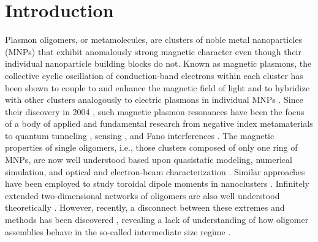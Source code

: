 \documentclass [11pt, proquest] {uwthesis}[2016/11/22]
\begin{document}
\section{Introduction}
Plasmon oligomers, or metamolecules, are clusters of noble metal nanoparticles (MNPs) that exhibit anomalously strong magnetic character even though their individual nanoparticle building blocks do not. Known as magnetic plasmons, the collective cyclic oscillation of conduction-band electrons within each cluster has been shown to couple to and enhance the magnetic field of light and to hybridize with other clusters analogously to electric plasmons in individual MNPs \cite{Zhang2006,Zhang2007,NordHal2011,NordHal2012,Cherqui2014,Cherqui2016,Engheta2017}. Since their discovery in 2004 \cite{Shalaev2004}, such magnetic plasmon resonances have been the focus of a body of applied and fundamental research from negative index metamaterials\cite{Alu2006,Alu2008} to quantum tunneling \cite{Dionne2016}, sensing \cite{Yang2013,Chen17}, and Fano interferences \cite{Dionne2011,Liu2011,Cherqui2016,Wang17}. The magnetic properties of single oligomers, i.e., those clusters composed of only one ring of MNPs, are now well understood based upon quasistatic modeling, numerical simulation, and optical and electron-beam characterization \cite{Nord2006,Dionne2011,Dionne2016,Capolino2017}. Similar approaches have been employed to study toroidal dipole moments in nanoclusters \cite{Ogut2012toroidal,Yang2013,Zheludev2016,Wang17}. Infinitely extended two-dimensional networks of oligomers are also well understood theoretically \cite{Schatz2003,Weick2013}. However, recently, a disconnect between these extremes and methods has been discovered \cite{Cherqui2014,Engheta2017}, revealing a lack of understanding of how oligomer assemblies behave in the so-called intermediate size regime \cite{NordHal2011,NordHal2012,Cherqui2014,Qian2015,Cherqui2016,Engheta2017,Fakhraai2018,Scherer2018}.
\end{document}
